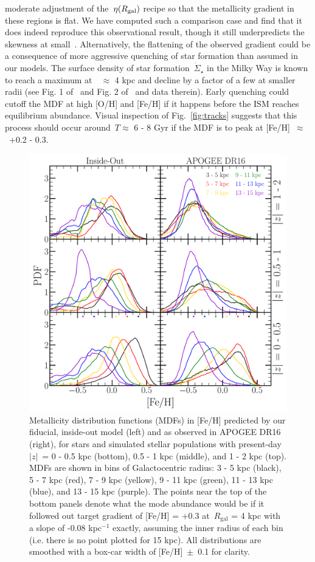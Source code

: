 \documentclass[draft2.tex]{subfiles}
\begin{document}
moderate adjustment of the~$\eta(R_\text{gal})$ recipe so that the metallicity 
gradient in these regions is flat. 
We have computed such a comparison case and find that it does indeed reproduce 
this observational result, though it still underpredicts the skewness at 
small~\rgal. 
Alternatively, the flattening of the observed gradient could be a consequence 
of more aggressive quenching of star formation than assumed in our models. 
The surface density of star formation~$\dot{\Sigma}_\star$ in the Milky Way 
is known to reach a maximum at~\rgal~$\approx$ 4 kpc and decline by a factor 
of a few at smaller radii (see Fig. 1 of~\citealp{Peek2009} and Fig. 2 
of~\citealp{Fraternali2012} and data therein). 
Early quenching could cutoff the MDF at high [O/H] and [Fe/H] if it happens 
before the ISM reaches equilibrium abundance. 
Visual inspection of Fig.~\ref{fig:tracks} suggests that this process should 
occur around~$T \approx$ 6 - 8 Gyr if the MDF is to peak at 
[Fe/H]~$\approx$~+0.2 - 0.3. 

\begin{figure} 
\centering 
\includegraphics[scale = 0.34]{mdf_3panel_fe.pdf} 
\caption{Metallicity distribution functions (MDFs) in [Fe/H] predicted by our 
fiducial, inside-out model (left) and as observed in APOGEE DR16 (right), for 
stars and simulated stellar populations with present-day~$\left|z\right|$~= 0 - 
0.5 kpc (bottom), 0.5 - 1 kpc (middle), and 1 - 2 kpc (top). MDFs are shown in 
bins of Galactocentric radius: 3 - 5 kpc (black), 5 - 7 kpc (red), 7 - 9 kpc 
(yellow), 9 - 11 kpc (green), 11 - 13 kpc (blue), and 13 - 15 kpc (purple). 
The points near the top of the bottom panels denote what the mode abundance 
would be if it followed out target gradient of [Fe/H] = +0.3 at~$R_\text{gal}$ 
= 4 kpc with a slope of -0.08 kpc$^{-1}$ exactly, assuming the inner radius of 
each bin (i.e. there is no point plotted for 15 kpc). All distributions are 
smoothed with a box-car width of [Fe/H]~$\pm$~0.1 for clarity. } 
\label{fig:mdf_3panel_fe} 
\end{figure} 
\end{document}
